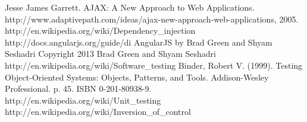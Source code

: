 \documentclass[14pt,a4paper]{extreport}
\begin{document}
\begin{thebibliography}{99}
 Jesse James Garrett. AJAX: A New Approach to Web Applications. http://www.adaptivepath.com/ideas/ajax-new-approach-web-applications, 2005.
 http://en.wikipedia.org/wiki/Dependency\_injection
 http://docs.angularjs.org/guide/di
 AngularJS by Brad Green and Shyam Seshadri
Copyright 2013 Brad Green and Shyam Seshadri
 http://en.wikipedia.org/wiki/Software\_testing
 Binder, Robert V. (1999). Testing Object-Oriented Systems: Objects, Patterns, and Tools. Addison-Wesley Professional. p. 45. ISBN 0-201-80938-9.
 http://en.wikipedia.org/wiki/Unit\_testing
 http://en.wikipedia.org/wiki/Inversion\_of\_control

\end{thebibliography}
\end{document}
